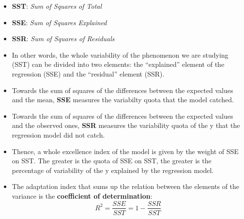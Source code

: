 \begin{frame}
  \vspace*{.25cm}
  \begin{itemize}
    \item \textbf{SST}: \textit{Sum of Squares of Total} 
    \item \textbf{SSE}: \textit{Sum of Squares Explained} 
    \item \textbf{SSR}: \textit{Sum of Squares of Residuals} 
    \vspace*{.5cm}
    \item In other words, the whole variability of the phenomenon we are studying (SST) can be divided into two elements: the ``explained'' element of the regression (SSE) and the ``residual'' element (SSR).
    \vspace*{.5cm}
    \item Towards the sum of squares of the differences between the expected values and the mean, \textbf{SSE} measures the variabilty quota that the model catched. 
    \item Towards the sum of squares of the differences between the expected values and the observed ones, \textbf{SSR} measures the variability quota of the y that the regression model did not catch.
  \end{itemize}
\end{frame}


\begin{frame}
  \vspace*{.5cm}
  \begin{itemize}
    \item Thence, a whole excellence index of the model is given by the weight of SSE on SST. The greater is the quota of SSE on SST, the greater is the percentage of variability of the y explained by the regression model.
    \vspace*{.75cm}
    \item The adaptation index that sums up the relation between the elements of the variance is the \textbf{coefficient of determination}:
      \vspace*{.4cm} $$ R^2 = \frac{SSE}{SST} = 1 - \frac{SSR}{SST} $$
  \end{itemize}
\end{frame}


